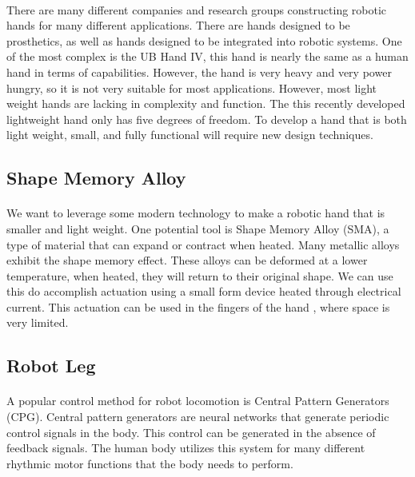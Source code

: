 \documentclass[titlepage,letterpaper,12pt]{article}
\begin{document}
\paragraph{}There are many different companies and research groups constructing
robotic hands for many different applications. There are hands designed to be
prosthetics, as well as hands designed to be integrated into robotic systems.
One of the most complex is the UB Hand IV, this hand is nearly the same as a
human hand in terms of capabilities. However, the hand is very heavy and very
power hungry, so it is not very suitable for most
applications\cite{Melchiorri2013}. However, most light weight hands are lacking
in complexity and function. The this recently developed lightweight hand only
has five degrees of freedom\cite{takaki2011high}. To develop a hand that is both
light weight, small, and fully functional will require new design techniques. 

\subsection{Shape Memory Alloy}
\paragraph{}We want to leverage some modern technology to make a robotic hand
that is smaller and light weight. One potential tool is Shape Memory Alloy
(SMA), a type of material that can expand or contract when
heated\cite{Schetky1982}. Many metallic alloys exhibit the shape memory
effect\cite{Wayman1993}. These alloys can be deformed at a lower temperature,
when heated, they will return to their original shape. We can use this do
accomplish actuation using a small form device heated through electrical
current\cite{Ikuta1990}. This actuation can be used in the fingers of the hand
, where space is very limited.

\subsection{Robot Leg}
\paragraph{}A popular control method for robot locomotion is Central Pattern
Generators (CPG). Central pattern generators are neural networks that generate
periodic control signals in the body. This control can be generated in the
absence of feedback signals. The human body utilizes this
system for many different rhythmic motor functions that the body needs to
perform\cite{cpggeneral}. 
\end{document}
